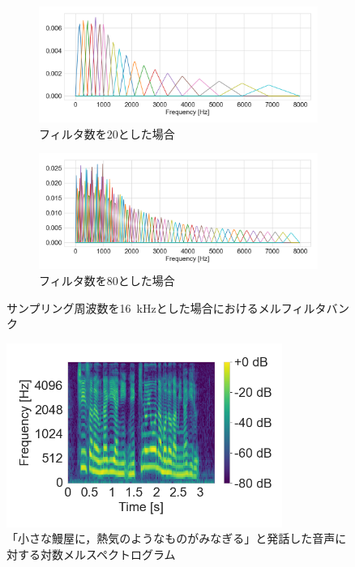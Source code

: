\begin{figure}[tb]
    \centering
    \begin{subfigure}[b]{1.0\textwidth}
        \centering
        \includegraphics[width=150mm]{./figure/sec2/melfb/onedim_20.png}
        \caption{フィルタ数を20とした場合}
        \label{sec2:fig:melfb_20}
    \end{subfigure}

    \vspace{0.5cm}

    \begin{subfigure}[b]{1.0\textwidth}
        \centering
        \includegraphics[width=150mm]{./figure/sec2/melfb/onedim_80.png}
        \caption{フィルタ数を80とした場合}
        \label{sec2:fig:melfb_80}
    \end{subfigure}
    \caption{サンプリング周波数を\SI{16}{\kHz}とした場合におけるメルフィルタバンク}
    \label{sec2:fig:melfb}
\end{figure}

\begin{figure}[bt]
    \centering
    \includegraphics[height=60mm]{./figure/sec2/melspectrogram.png}
    \caption{「小さな鰻屋に，熱気のようなものがみなぎる」と発話した音声に対する対数メルスペクトログラム}
    \label{sec2:fig:melspectrogram}
\end{figure}